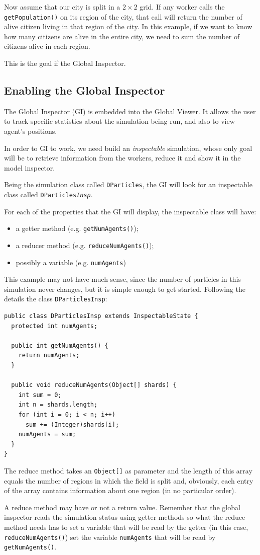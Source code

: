 \documentclass{article}
\begin{document}
Now assume that our city is split in a $2\times2$ grid. If any worker calls the \texttt{getPopulation()} on its region of the city, that call will return the number of alive citizen living in that region of the city. In this example, if we want to know how many citizens are alive in the entire city, we need to sum the number of citizens alive in each region.

This is the goal if the Global Inspector.

\subsection{Enabling the Global Inspector}
The Global Inspector (GI) is embedded into the Global Viewer. It allows the user to track specific statistics about the simulation being run, and also to view agent's positions.

In order to GI to work, we need build an \emph{inspectable} simulation, whose only goal will be to retrieve information from the workers, reduce it and show it in the model inspector.

Being the simulation class called \texttt{DParticles}, the GI will look for an inspectable class called  \texttt{DParticles\emph{Insp}}.

For each of the properties that the GI will display, the inspectable class will have:

\begin{itemize}
	\item a getter method (e.g. \texttt{getNumAgents()});  
  \item a reducer method (e.g. \texttt{reduceNumAgents()});
  \item possibly a variable (e.g. \texttt{numAgents})
\end{itemize}

This example may not have much sense, since the number of particles in this simulation never changes, but it is simple enough to get started. Following the details the class \texttt{DParticlesInsp}:

\begin{lstlisting}
public class DParticlesInsp extends InspectableState {
  protected int numAgents;

  public int getNumAgents() {
    return numAgents;
  }

  public void reduceNumAgents(Object[] shards) {
    int sum = 0;
    int n = shards.length;
    for (int i = 0; i < n; i++)
      sum += (Integer)shards[i];
    numAgents = sum;
  }
}
\end{lstlisting}

The reduce method takes an \texttt{Object[]} as parameter and the length of this array equals the number of regions in which the field is split and, obviously, each entry of the array contains information about one region (in no particular order).

A reduce method may have or not a return value. Remember that the global inspector reads the simulation status using getter methods so what the reduce method needs has to set a variable that will be read by the getter (in this case, \texttt{reduceNumAgents()}) set the variable \texttt{numAgents} that will be read by \texttt{getNumAgents()}.
\end{document}
